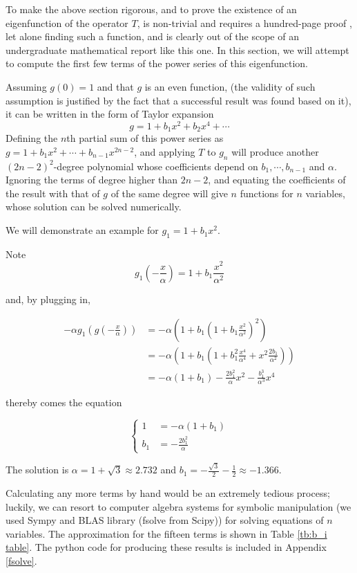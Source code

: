 To make the above section rigorous, and to prove the existence of an eigenfunction of the operator $T$, is non-trivial and requires a hundred-page proof \cite{lyubich1999feigenbaum}, let alone finding such a function, and is clearly out of the scope of an undergraduate mathematical report like this one. 
In this section, we will attempt to compute the first few terms of the power series of this eigenfunction.

Assuming $g(0) = 1$ and that $g$ is an even function, (the validity of such assumption is justified by the fact that a successful result was found based on it), it can be written in the form of Taylor expansion 
$$
g = 1 + b_1 x^2 + b_2x^4 + \cdots 
$$
Defining the $n$th partial sum of this power series as $g = 1 + b_1x^2 + \cdots + b_{n-1}x^{2n-2}$, and applying $T$ to $g_n$ will produce another $(2n-2)^2$-degree polynomial whose coefficients depend on $b_1, \cdots, b_{n-1}$ and $\alpha$.
Ignoring the terms of degree higher than $2n-2$, and equating the coefficients of the result with that of $g$ of the same degree will give $n$ functions for $n$ variables, whose solution can be solved numerically. 

We will demonstrate an example for $g_1 = 1 + b_1 x^2$. 

Note 
$$
g_1\left(-\frac{x}{\alpha}\right) = 1 + b_1 \frac{x^2}{\alpha ^2}
$$

and, by plugging in,

\begin{align*}
-\alpha g_1\left(g\left(-\frac{x}{\alpha}\right)\right) 
&= -\alpha\left( 1 + b_1\left(1+b_1 \frac{x^2}{\alpha^2}\right)^2\right) \\
&= -\alpha\left(1 + b_1\left(1 + b_1^2\frac{x^4}{\alpha^4} + x^2 \frac{2b_1}{\alpha^2}\right)\right) \\
&= -\alpha (1 + b_1)  - \frac{2b_1^2}{\alpha} x^2 - \frac{b_1^3}{\alpha^3}x^4
\end{align*}

thereby comes the equation 

$$
\begin{cases}
    1 &= -\alpha(1+b_1) \\
    b_1 &= -\frac{2b_1^2}{\alpha} 
\end{cases}
$$

The solution is $\alpha = 1 + \sqrt{3} \approx 2.732$ and $b_1 = - \frac{\sqrt{3}}{2} - \frac{1}{2} \approx -1.366$.

Calculating any more terms by hand would be an extremely tedious process; luckily, we can resort to computer algebra systems for symbolic manipulation (we used Sympy and BLAS library (fsolve from Scipy)) for solving equations of $n$ variables. 
The approximation for the fifteen terms is shown in Table \ref{tb:b_i table}.
The python code for producing these results is included in Appendix \ref{fsolve}.

